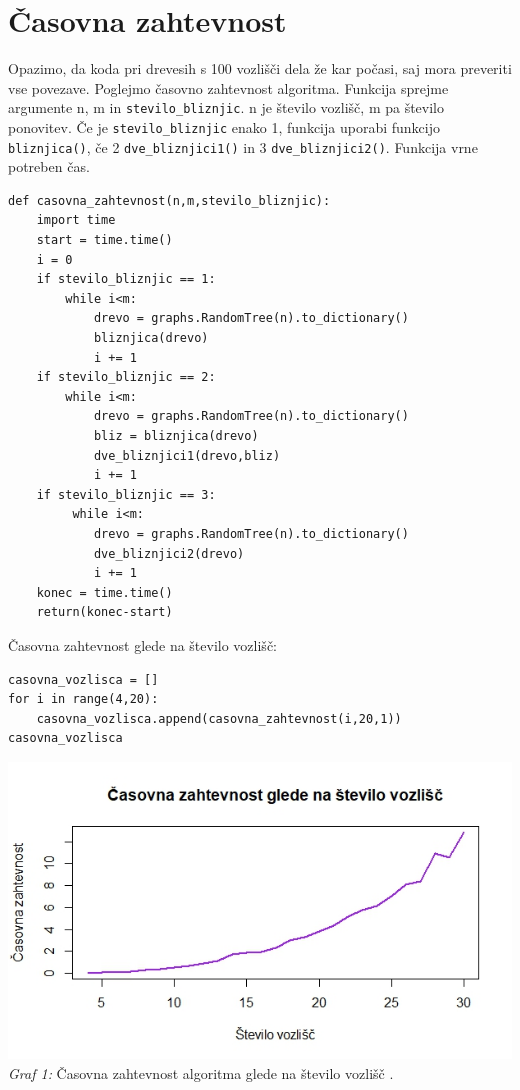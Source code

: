 \documentclass[a4paper,10pt]{article}
\begin{document}
\section{Časovna zahtevnost}
Opazimo, da koda pri drevesih s 100 vozlišči dela že kar počasi, saj mora preveriti vse povezave. Poglejmo časovno zahtevnost algoritma. Funkcija sprejme argumente n, m in \texttt{stevilo\_bliznjic}. n je število vozlišč, m pa število ponovitev. Če je \texttt{stevilo\_bliznjic} enako 1, funkcija uporabi funkcijo \texttt{bliznjica()}, če 2 \texttt{dve\_bliznjici1()} in 3 \texttt{dve\_bliznjici2()}. Funkcija vrne potreben čas.
\begin{verbatim}
def casovna_zahtevnost(n,m,stevilo_bliznjic):
    import time
    start = time.time()
    i = 0
    if stevilo_bliznjic == 1:
        while i<m:
            drevo = graphs.RandomTree(n).to_dictionary()
            bliznjica(drevo)
            i += 1
    if stevilo_bliznjic == 2:
        while i<m:
            drevo = graphs.RandomTree(n).to_dictionary()
            bliz = bliznjica(drevo)
            dve_bliznjici1(drevo,bliz)
            i += 1
    if stevilo_bliznjic == 3:
         while i<m:
            drevo = graphs.RandomTree(n).to_dictionary()
            dve_bliznjici2(drevo)
            i += 1
    konec = time.time()
    return(konec-start)
\end{verbatim}
Časovna zahtevnost glede na število vozlišč:
\begin{verbatim}
casovna_vozlisca = []
for i in range(4,20):
    casovna_vozlisca.append(casovna_zahtevnost(i,20,1))
casovna_vozlisca
\end{verbatim}
\begin{center}
\includegraphics[scale = 0.8]{casovna}\\ 
\scriptsize{\textit{Graf 1: } Časovna zahtevnost algoritma glede na število vozlišč .}
\end{center}
\end{document}
